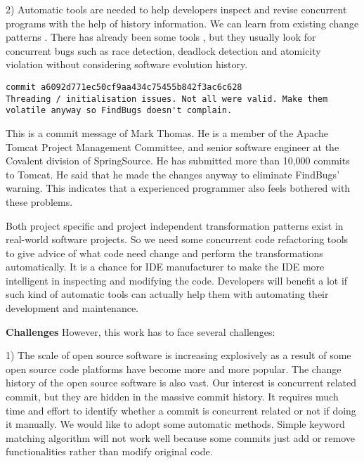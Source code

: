 
2) Automatic tools are needed to help developers inspect and revise concurrent programs with the help of history information. We can learn from existing change patterns \cite{conf/pldi/MengKM11}. There has already been some tools \cite{conf/ppopp/SamakR14, conf/sigsoft/EslamimehrP14, conf/pldi/BiswasHSB14}, but they usually look for concurrent bugs such as race detection, deadlock detection and atomicity violation without considering software evolution history.

\lstset{numbers=left, breaklines=true,  basicstyle=\ttfamily\tiny,  xleftmargin=3em, tabsize=2}
\begin{lstlisting}
commit a6092d771ec50cf9aa434c75455b842f3ac6c628
Threading / initialisation issues. Not all were valid. Make them volatile anyway so FindBugs doesn't complain.
\end{lstlisting}

This is a commit message of Mark Thomas. He is a member of the Apache Tomcat Project Management Committee, and senior software engineer at the Covalent division of SpringSource. He has submitted more than 10,000 commits to Tomcat. He said that he made the changes anyway to eliminate FindBugs' warning. This indicates that a experienced programmer also feels bothered with these problems.

Both project specific and project independent transformation patterns exist in real-world software projects. So we need some concurrent code refactoring tools to give advice of what code need change and perform the transformations automatically. It is a chance for IDE manufacturer to make the IDE more intelligent in inspecting and modifying the code. Developers will benefit a lot if such kind of automatic tools can actually help them with automating their development and maintenance.

\textbf{Challenges} However, this work has to face several challenges:

1) The scale of open source software is increasing explosively as a result of some open source code platforms have become more and more popular. The change history of the open source software is also vast. Our interest is concurrent related commit, but they are hidden in the massive commit history. It requires much time and effort to identify whether a commit is concurrent related or not if doing it manually. We would like to adopt some automatic methods. Simple keyword matching algorithm will not work well because some commits just add or remove functionalities rather than modify original code.


